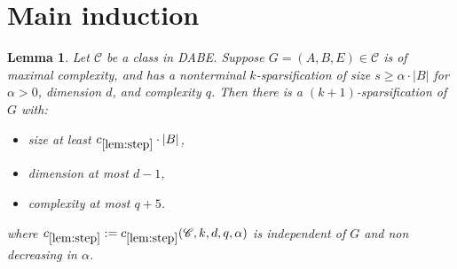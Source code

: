 \documentclass[11pt]{article}
\newtheorem{lemma}[theorem]{Lemma}
\theoremstyle{definition}
\newcommand{\CC}{{\mathscr C}}
\renewcommand{\ge}{\geqslant}
\begin{document}
\section{Main induction}
\begin{lemma}\label{lem:step}
  Let $\CC$ be a class in DABE.
  Suppose $G=(A,B,E) \in \CC$ is of maximal complexity, and has a nonterminal $k$-sparsification of size $s \ge \alpha \cdot |B|$ for $\alpha >0$,
  dimension $d$, and complexity $q$.
  Then there is a $(k+1)$-sparsification of $G$ with:
  \begin{itemize}
    \item size at least $c_{\ref{lem:step}} \cdot |B|$,
    \item dimension at most $d-1$,
    \item complexity at most $q+5$.
  \end{itemize}
  where $c_{\ref{lem:step}} := c_{\ref{lem:step}}(\CC, k, d, q, \alpha)$ is independent of $G$ and non decreasing in $\alpha$.
\end{lemma}
\end{document}
